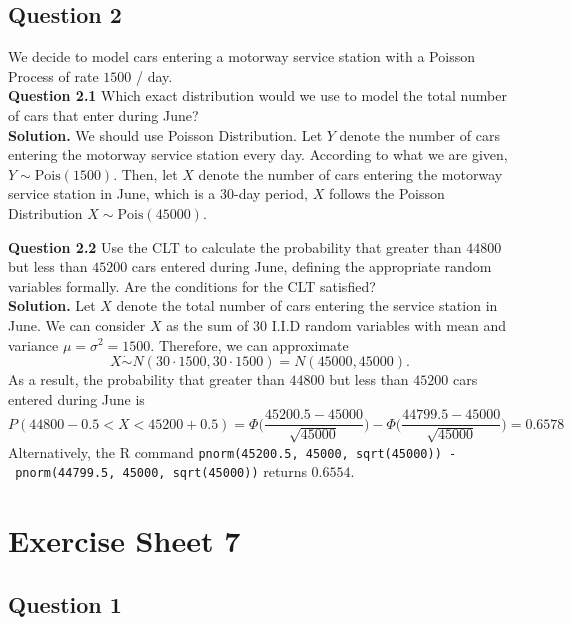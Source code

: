 \documentclass[
]{book}
\begin{document}
\section{Question 2}\label{question-2-5}

We decide to model cars entering a motorway service station with a Poisson Process of rate \(1500\) / day.\\
\textbf{Question 2.1} Which exact distribution would we use to model the total number of cars that enter
during June?\\
\textbf{Solution.} We should use Poisson Distribution. Let \(Y\) denote the number of cars entering the motorway service station every day. According to what we are given, \(Y \sim \text{Pois}(1500)\). Then, let \(X\) denote the number of cars entering the motorway service station in June, which is a 30-day period, \(X\) follows the Poisson Distribution \(X \sim \text{Pois}(45000)\).

\textbf{Question 2.2} Use the CLT to calculate the probability that greater than \(44800\) but less than \(45200\) cars entered during June, defining the appropriate random variables formally. Are the conditions for the CLT satisfied?\\
\textbf{Solution.} Let \(X\) denote the total number of cars entering the service station in June. We can consider \(X\) as the sum of \(30\) I.I.D random variables with mean and variance \(\mu = \sigma^2 = 1500\). Therefore, we can approximate \[X \dot\sim N(30\cdot 1500, 30\cdot 1500) = N(45000, 45000).\]
As a result, the probability that greater than \(44800\) but less than \(45200\) cars entered during June is
\[P(44800 - 0.5 < X < 45200 + 0.5) = \Phi \bigg(\frac{45200.5 - 45000}{\sqrt{45000}} \bigg) - \Phi \bigg(\frac{44799.5-45000}{\sqrt{45000}} \bigg) = 0.6578\]
Alternatively, the R command \texttt{pnorm(45200.5,\ 45000,\ sqrt(45000))\ -\ pnorm(44799.5,\ 45000,\ sqrt(45000))} returns \(0.6554\).

\chapter{Exercise Sheet 7}\label{exercise-sheet-7}

\section{Question 1}\label{question-1-6}
\end{document}
